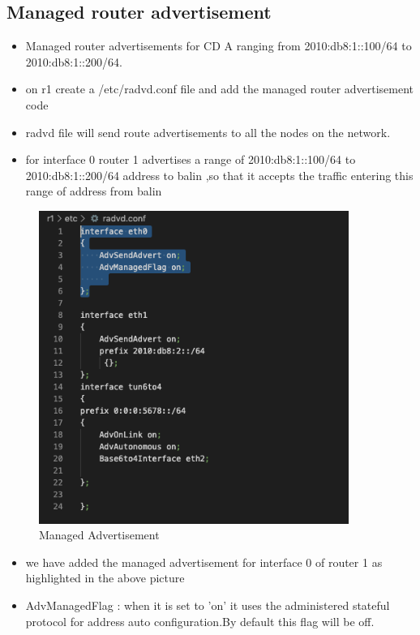   \subsection{Managed router advertisement}
  \begin{itemize}
    \item Managed router advertisements for CD A ranging from 2010:db8:1::100/64 to 2010:db8:1::200/64.
    \item on r1 create a /etc/radvd.conf  file and add the managed router advertisement code
    \item radvd file will send route advertisements to all the nodes on
       the network.  
       \item for interface 0 router 1 advertises a range of 2010:db8:1::100/64 to 2010:db8:1::200/64 address to balin ,so that it accepts the traffic entering this range of address from balin 
    \end{itemize}
\begin{figure}[H]
\centering
  \includegraphics[width=0.9\textwidth]{images/managed advertisement.png}
  \caption{Managed Advertisement}
  \label{fig:2.2 }
  \end{figure}
  \begin{itemize}
    \item we have added the managed advertisement for interface 0 of router 1 as highlighted in the above picture
    \item AdvManagedFlag : when it is set to 'on' it uses the administered stateful protocol for address  auto configuration.By default this flag will be off.
    \end{itemize}
